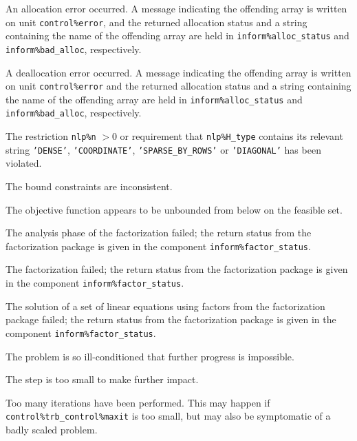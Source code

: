 \documentclass{galahad}
\begin{document}
\begin{description}

 An allocation error occurred.
A message indicating the offending
array is written on unit {\tt control\%error}, and the returned allocation
status and a string containing the name of the offending array
are held in {\tt inform\%alloc\_\-status}
and {\tt inform\%bad\_alloc}, respectively.

 A deallocation error occurred.
A message indicating the offending
array is written on unit {\tt control\%error} and the returned allocation
status and a string containing the name of the offending array
are held in {\tt inform\%alloc\_\-status}
and {\tt inform\%bad\_alloc}, respectively.

  The restriction {\tt nlp\%n} $> 0$
  or requirement that {\tt nlp\%H\_type} contains its relevant string
  {\tt 'DENSE'}, {\tt 'COORDINATE'}, {\tt 'SPARSE\_BY\_ROWS'}
  or {\tt 'DIAGONAL'}
  has been violated.


 The bound constraints are inconsistent.

  The objective function appears to be unbounded
 from below on the feasible set.

 The analysis phase of the factorization failed;
 the return status from the factorization
    package is given in the component {\tt inform\%fac\-t\-or\_status}.

 The factorization failed;
 the return status from the factorization
    package is given in the component {\tt inform\%fac\-t\-or\_status}.

 The solution of a set of linear equations
 using factors from the factorization package failed;
 the return status from the factorization
    package is given in the component {\tt inform\%fac\-t\-or\_status}.

 The problem is so ill-conditioned that
  further progress is impossible.

 The step is too small to make further impact.

 Too many iterations have been performed.
  This may happen if
    {\tt control\%trb\_control\%maxit} is too small, but may also be 
    symptomatic of a badly scaled problem.


\end{description}
\end{document}

